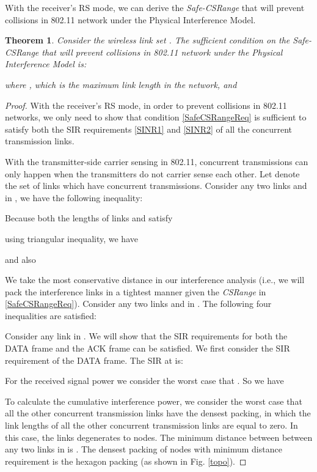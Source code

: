 \documentclass[conference]{IEEEtran}
\newtheorem{theorem}{Theorem}
\begin{document}
With the receiver's RS mode, we can derive the \emph{Safe-CSRange}
that will prevent collisions in 802.11 network under the Physical
Interference Model.

\begin{theorem}
\label{SafeCSRange} Consider the wireless link set .
The suff\/icient condition on the \emph{Safe-CSRange} that will
prevent collisions in 802.11 network under the Physical Interference
Model is:

where , which is the maximum link length in the
network, and

\end{theorem}

\begin{proof}
With the receiver's RS mode, in order to prevent collisions in
802.11 networks, we only need to show that condition
\eqref{SafeCSRangeReq} is suff\/icient to satisfy both the SIR
requirements \eqref{SINR1} and \eqref{SINR2} of all the concurrent
transmission links.

With the transmitter-side carrier sensing in 802.11, concurrent
transmissions can only happen when the transmitters do not carrier
sense each other. Let  denote the set of links
which have concurrent transmissions. Consider any two links 
and  in , we have the following inequality:

Because both the lengths of links  and  satisfy

using triangular inequality, we have



and also


We take the most conservative distance  in our
interference analysis (i.e., we will pack the interference links in
a tightest manner given the \emph{CSRange} in
\eqref{SafeCSRangeReq}). Consider any two links  and  in
. The following four inequalities are
satisf\/ied:


Consider any link  in . We will show that
the SIR requirements for both the DATA frame and the ACK frame can
be satisf\/ied. We first consider the SIR requirement of the DATA
frame. The SIR at  is:


For the received signal power we consider the worst case that
.  So we have


To calculate the cumulative interference power, we consider the
worst case that all the other concurrent transmission links have the
densest packing, in which the link lengths of all the other
concurrent transmission links are equal to zero. In this case, the
links degenerates to nodes. The minimum distance between between any
two links in  is . The densest
packing of nodes with minimum distance requirement is the hexagon
packing (as shown in Fig. \ref{topo}).


\end{proof}
\end{document}
